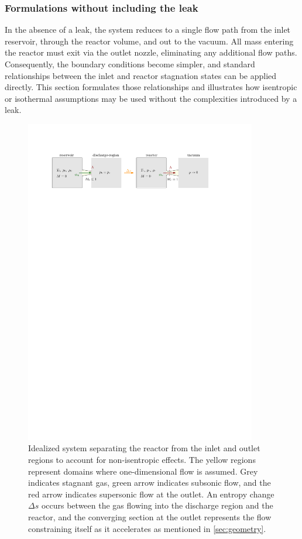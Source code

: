 \subsubsection*{Formulations without including the leak}
	In the absence of a leak, the system reduces to a single flow path from the inlet reservoir, through the reactor volume, and out to the vacuum.
	All mass entering the reactor must exit via the outlet nozzle, eliminating any additional flow paths.
	Consequently, the boundary conditions become simpler, and standard relationships between the inlet and reactor stagnation states can be applied directly.
	This section formulates those relationships and illustrates how isentropic or isothermal assumptions may be used without the complexities introduced by a leak.
	\begin{figure}[H]
	    \centering
	    \includegraphics[width=0.9\textwidth]{src/03_analytical-work/fig_disconnected-reservoirs.pdf}
	    \caption{Idealized system separating the reactor from the inlet and outlet regions to account for non-isentropic effects. The yellow regions represent domains where one-dimensional flow is assumed. Grey indicates stagnant gas, green arrow indicates subsonic flow, and the red arrow indicates supersonic flow at the outlet. An entropy change $\Delta s$ occurs between the gas flowing into the discharge region and the reactor, and the converging section at the outlet represents the flow constraining itself as it accelerates as mentioned in \ref{sec:geometry}.}
	    \label{fig:disconnected-reservoirs}
	\end{figure}
